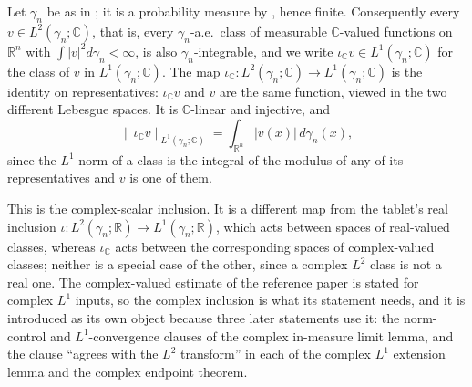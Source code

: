 \begin{definition}
Let $\gamma_n$ be as in ; it is a probability measure by
, hence finite.  Consequently every
$v \in L^2(\gamma_n;\mathbb{C})$, that is, every $\gamma_n$-a.e.\ class of
measurable $\mathbb{C}$-valued functions on $\mathbb{R}^n$ with
$\int|v|^2 d\gamma_n < \infty$, is also $\gamma_n$-integrable, and we write
$\iota_{\mathbb{C}} v \in L^1(\gamma_n;\mathbb{C})$ for the class of $v$ in
$L^1(\gamma_n;\mathbb{C})$.  The map
$\iota_{\mathbb{C}} : L^2(\gamma_n;\mathbb{C}) \to L^1(\gamma_n;\mathbb{C})$ is
the identity on representatives: $\iota_{\mathbb{C}} v$ and $v$ are the same
function, viewed in the two different Lebesgue spaces.  It is $\mathbb{C}$-linear
and injective, and
\[
  \|\iota_{\mathbb{C}} v\|_{L^1(\gamma_n;\mathbb{C})}
    = \int_{\mathbb{R}^n} |v(x)| \, d\gamma_n(x) ,
\]
since the $L^1$ norm of a class is the integral of the modulus of any of its
representatives and $v$ is one of them.

This is the complex-scalar inclusion.  It is a different map from the tablet's
real inclusion $\iota : L^2(\gamma_n;\mathbb{R}) \to L^1(\gamma_n;\mathbb{R})$,
which acts between spaces of real-valued classes, whereas $\iota_{\mathbb{C}}$
acts between the corresponding spaces of complex-valued classes; neither is a
special case of the other, since a complex $L^2$ class is not a real one.  The
complex-valued estimate of the reference paper is stated for complex $L^1$
inputs, so the complex inclusion is what its statement needs, and it is
introduced as its own object because three later statements use it: the
norm-control and $L^1$-convergence clauses of the complex in-measure limit
lemma, and the clause ``agrees with the $L^2$ transform'' in each of the complex
$L^1$ extension lemma and the complex endpoint theorem.
\end{definition}
